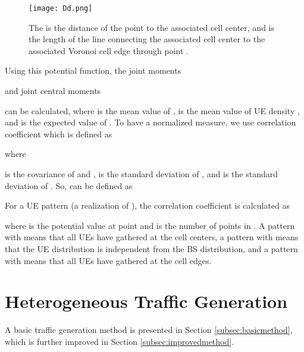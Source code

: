 \documentclass[journal]{IEEEtran}
\begin{document}
\begin{figure}
\centering
\texttt{[image: Dd.png]}
\caption{The  is the distance of the point  to the associated cell center, and  is the length of the line connecting the associated cell center to the associated Voronoi cell edge through point .}
\label{fig:Dd}
\end{figure}

Using this potential function, the joint moments

and joint central moments

can be calculated, where  is the mean value of ,  is the mean value of UE density , and  is the expected value of  \cite{alberto1994probability}. To have a normalized measure, we use correlation coefficient which is defined as

where

is the covariance of  and ,  is the standard deviation of , and  is the standard deviation of . So,  can be defined as


For a UE pattern  (a realization of ), the correlation coefficient is calculated as

where  is the potential value at point  and  is the number of points in . A pattern with  means that all UEs have gathered at the cell centers, a pattern with  means that the UE distribution is independent from the BS distribution, and a pattern with  means that all UEs have gathered at the cell edges.






























\section{Heterogeneous Traffic Generation}
\label{sec:generation}

A basic traffic generation method is presented in Section \ref{subsec:basicmethod}, which is further improved in Section \ref{subsec:improvedmethod}.
\end{document}
